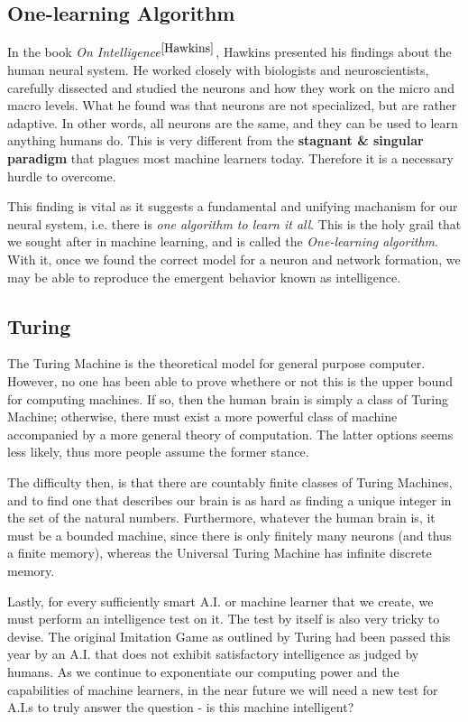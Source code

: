 \documentclass[12pt]{article}  %
\begin{document}
\subsection{One-learning Algorithm}\label{one-alg}

In the book \emph{On Intelligence}$^{\ref{Hawkins}}$, Hawkins presented his findings about the human neural system. He worked closely with biologists and neuroscientists, carefully dissected and studied the neurons and how they work on the micro and macro levels. What he found was that neurons are not specialized, but are rather adaptive. In other words, all neurons are the same, and they can be used to learn anything humans do. This is very different from the {\bf stagnant \& singular paradigm} that plagues most machine learners today. Therefore it is a necessary hurdle to overcome.

This finding is vital as it suggests a fundamental and unifying machanism for our neural system, i.e. there is \emph{one algorithm to learn it all}. This is the holy grail that we sought after in machine learning, and is called the \emph{One-learning algorithm}. With it, once we found the correct model for a neuron and network formation, we may be able to reproduce the emergent behavior known as intelligence.

\subsection{Turing}

The Turing Machine is the theoretical model for general purpose computer. However, no one has been able to prove whethere or not this is the upper bound for computing machines. If so, then the human brain is simply a class of Turing Machine; otherwise, there must exist a more powerful class of machine accompanied by a more general theory of computation. The latter options seems less likely, thus more people assume the former stance.

The difficulty then, is that there are countably finite classes of Turing Machines, and to find one that describes our brain is as hard as finding a unique integer in the set of the natural numbers. Furthermore, whatever the human brain is, it must be a bounded machine, since there is only finitely many neurons (and thus a finite memory), whereas the Universal Turing Machine has infinite discrete memory.

Lastly, for every sufficiently smart A.I. or machine learner that we create, we must perform an intelligence test on it. The test by itself is also very tricky to devise. The original Imitation Game as outlined by Turing had been passed this year by an A.I. that does not exhibit satisfactory intelligence as judged by humans. As we continue to exponentiate our computing power and the capabilities of machine learners, in the near future we will need a new test for A.I.s to truly answer the question - is this machine intelligent?
\end{document}
